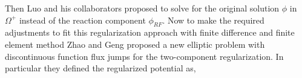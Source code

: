 %	
%	
%	
%
Then Luo and his collaborators \cite{Cai2009} proposed to solve for the original solution $\phi$ in $\Omega^+$ instead of the reaction component $\phi_{RF}$. Now to make the required adjustments to fit this regularization approach \cite{Cai2009} with finite difference and finite element method Zhao and Geng \cite{Geng2017a} proposed a new elliptic problem with discontinuous function flux jumps for the two-component regularization. In particular they defined the regularized potential as,  
	
